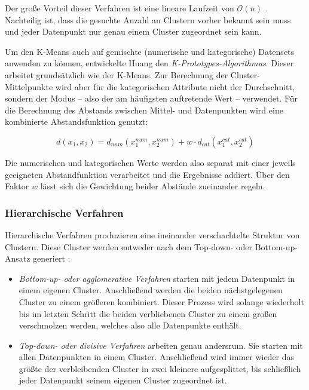 Der große Vorteil dieser Verfahren ist eine lineare Laufzeit von
\(\mathcal{O}(n)\) \autocite{huang1998}. Nachteilig ist, dass die
gesuchte Anzahl an Clustern vorher bekannt sein muss und jeder
Datenpunkt nur genau einem Cluster zugeordnet sein kann. \autocite[ Kap.
1.3.1 Partitioning Methods]{kaufman2009}

Um den K-Means auch auf gemischte (numerische und kategorische)
Datensets anwenden zu können, entwickelte Huang \autocite{huang1998} den
\emph{K-Prototypes-Algorithmus}. Dieser arbeitet grundsätzlich wie der
K-Means. Zur Berechnung der Cluster-Mittelpunkte wird aber für die
kategorischen Attribute nicht der Durchschnitt, sondern der Modus --
also der am häufigsten auftretende Wert -- verwendet. Für die Berechnung
des Abstands zwischen Mittel- und Datenpunkten wird eine kombinierte
Abstandsfunktion genutzt:

\begin{equation}
    d(x_1,x_2) = d_{num}(x^{num}_1,x^{num}_2) + w \cdot d_{cat}(x^{cat}_1,x^{cat}_2)
\end{equation}

Die numerischen und kategorischen Werte werden also separat mit einer
jeweils geeigneten Abstandfunktion verarbeitet und die Ergebnisse
addiert. Über den Faktor \(w\) lässt sich die Gewichtung beider Abstände
zueinander regeln. \autocite{huang1998}

\hypertarget{hierarchische-verfahren}{%
\subsubsection{Hierarchische Verfahren}\label{hierarchische-verfahren}}

Hierarchische Verfahren produzieren eine ineinander verschachtelte
Struktur von Clustern. Diese Cluster werden entweder nach dem Top-down-
oder Bottom-up-Ansatz generiert \autocite[ Kap. 1.3.2 Hierarchical
Methods]{kaufman2009}:

\begin{itemize}
\tightlist
\item
  \emph{Bottom-up- oder agglomerative Verfahren} starten mit jedem
  Datenpunkt in einem eigenen Cluster. Anschließend werden die beiden
  nächstgelegenen Cluster zu einem größeren kombiniert. Dieser Prozess
  wird solange wiederholt bis im letzten Schritt die beiden verbliebenen
  Cluster zu einem großen verschmolzen werden, welches also alle
  Datenpunkte enthält.
\item
  \emph{Top-down- oder divisive Verfahren} arbeiten genau andersrum. Sie
  starten mit allen Datenpunkten in einem Cluster. Anschließend wird
  immer wieder das größte der verbleibenden Cluster in zwei kleinere
  aufgesplittet, bis schließlich jeder Datenpunkt seinem eigenen Cluster
  zugeordnet ist.
\end{itemize}

